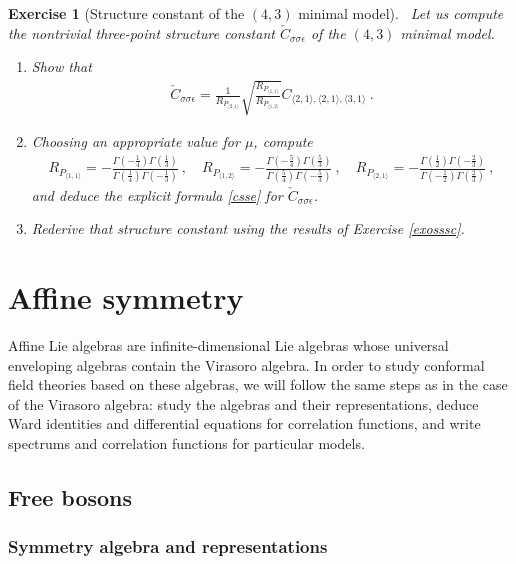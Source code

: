 \documentclass[12pt, a4paper, notitlepage, twoside]{report}
\numberwithin{equation}{section}
\theoremstyle{break}
\newtheorem{exo}{Exercise}[chapter]
\begin{document}
\begin{exo}[Structure constant of the $(4,3)$ minimal model]
 ~\label{exocsse}
 Let us compute the nontrivial three-point structure constant $\check{C}_{\sigma\sigma\epsilon} $ of the $(4,3)$ minimal model.
 \begin{enumerate}
  \item Show that 
\begin{align}
 \check{C}_{\sigma\sigma\epsilon} = \frac{1}{R_{P_{\langle 2,1 \rangle}}}\sqrt{\frac{R_{P_{\langle 1,1 \rangle}}}{R_{P_{\langle 1,2 \rangle}}}} C_{\langle 2,1\rangle , \langle 2,1 \rangle,\langle 3,1 \rangle}\ .
\end{align}
\item Choosing an appropriate value for $\mu$, compute
\begin{align}
 R_{P_{\langle 1,1 \rangle}} = -\frac{\Gamma(-\frac14)\Gamma(\frac13)}{\Gamma(\frac14)\Gamma(-\frac13)} \ , \quad R_{P_{\langle 1,2 \rangle}} = -\frac{\Gamma(-\frac54)\Gamma(\frac53)}{\Gamma(\frac54)\Gamma(-\frac53)} \ , \quad R_{P_{\langle 2,1 \rangle}} = -\frac{\Gamma(\frac12)\Gamma(-\frac23)}{\Gamma(-\frac12)\Gamma(\frac23)}\ ,
\end{align}
and deduce the explicit formula \eqref{csse} for $\check{C}_{\sigma\sigma\epsilon}$.
\item Rederive that structure constant using the results of Exercise \ref{exosssc}.
 \end{enumerate}
\end{exo}


\chapter{Affine symmetry \label{secaff}}

Affine Lie algebras are infinite-dimensional Lie algebras whose universal enveloping algebras contain the Virasoro algebra.
In order to study conformal field theories based on these algebras, we will follow the same steps as in the case of the Virasoro algebra: study the algebras and their representations, deduce Ward identities and differential equations for correlation functions, and write spectrums and correlation functions for particular models. 

\section{Free bosons}\label{secfb}

\subsection{Symmetry algebra and representations \label{secaua}}
\end{document}

